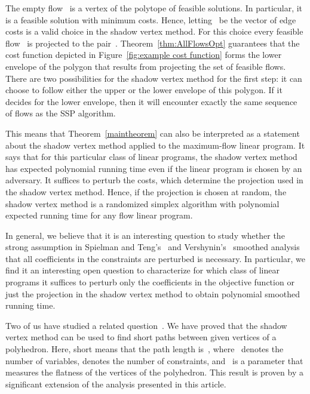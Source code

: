 \documentclass[11pt]{article}
\begin{document}
The empty flow~ is a vertex of the polytope of feasible solutions. In particular, it is a feasible solution with minimum costs. Hence, letting~ be
the vector of edge costs is a valid choice in the shadow vertex method. For this choice every feasible flow~ is projected to the pair~. 
Theorem~\ref{thm:AllFlowsOpt} guarantees that the cost function depicted in Figure~\ref{fig:example cost function} forms the lower envelope of the  
polygon that results from projecting the set of feasible flows. There are two possibilities for the shadow vertex method for the first step: it can choose
to follow either the upper or the lower envelope of this polygon. If it decides for the lower envelope, then it will encounter exactly the same sequence of flows
as the SSP algorithm.

This means that Theorem~\ref{maintheorem} can also be interpreted as a statement about the shadow vertex method applied to the maximum-flow linear
program. It says that for this particular class of linear programs, the shadow vertex method has expected polynomial running time even if the linear program is chosen
by an adversary. It suffices to perturb the costs, which determine the projection used in the shadow vertex method. Hence, if the projection
is chosen at random, the shadow vertex method is a randomized simplex algorithm with polynomial expected running time
for any flow linear program. 

In general, we believe that it is an interesting question to study whether the strong assumption in Spielman and Teng's~\cite{DBLP:journals/jacm/SpielmanT04} and 
Vershynin's~\cite{DBLP:journals/siamcomp/Vershynin09} smoothed analysis that all coefficients in the constraints are perturbed is necessary. In particular, we find
it an interesting open question to characterize for which class of linear programs it suffices to perturb only the coefficients in the objective
function or just the projection in the shadow vertex method to obtain polynomial smoothed running time.

Two of us have studied a related question~\cite{BrunschR13}. 
We have proved that the shadow vertex method can be used
to find short paths between given vertices of a polyhedron. Here, short
means that the path length is~, where~ denotes the number of
variables,  denotes the number of constraints, and~ is a parameter 
that measures the flatness of the vertices of the polyhedron.
This result is proven by a significant extension of the analysis presented in this article.
\end{document}
